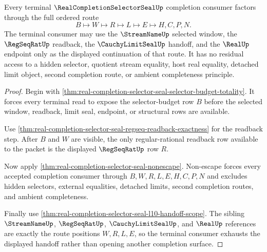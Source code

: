 \begin{theorem}
\label{thm:real-completion-selector-seal-terminal-consumer-exhaustion}
Every terminal $\RealCompletionSelectorSealUp$ completion consumer factors through the full ordered route
$$
B \longmapsto W \longmapsto R \longmapsto L \longmapsto E \longmapsto H,C,P,N.
$$
The terminal consumer may use the $\StreamNameUp$ selected window, the $\RegSeqRatUp$ readback, the $\CauchyLimitSealUp$ handoff, and the $\RealUp$ endpoint only as the displayed continuation of that route. It has no residual access to a hidden selector, quotient stream equality, host real equality, detached limit object, second completion route, or ambient completeness principle.
\end{theorem}
\begin{proof}
Begin with \autoref{thm:real-completion-selector-seal-selector-budget-totality}. It forces every terminal read to expose the selector-budget row $B$ before the selected window, readback, limit seal, endpoint, or structural rows are available.

Use \autoref{thm:real-completion-selector-seal-regseq-readback-exactness} for the readback step. After $B$ and $W$ are visible, the only regular-rational readback row available to the packet is the displayed $\RegSeqRatUp$ row $R$.

Now apply \autoref{thm:real-completion-selector-seal-nonescape}. Non-escape forces every accepted completion consumer through $B,W,R,L,E,H,C,P,N$ and excludes hidden selectors, external equalities, detached limits, second completion routes, and ambient completeness.

Finally use \autoref{thm:real-completion-selector-seal-l10-handoff-scope}. The sibling $\StreamNameUp$, $\RegSeqRatUp$, $\CauchyLimitSealUp$, and $\RealUp$ references are exactly the route positions $W,R,L,E$, so the terminal consumer exhausts the displayed handoff rather than opening another completion surface.
\end{proof}

